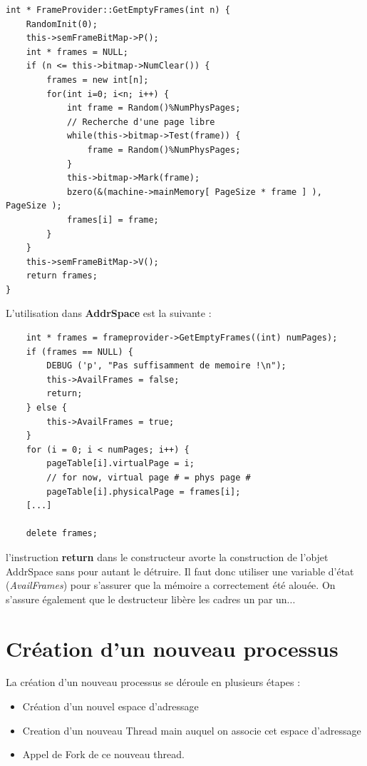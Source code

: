 \documentclass[a4paper,10pt]{article}
\begin{document}
\begin{lstlisting}
int * FrameProvider::GetEmptyFrames(int n) {
    RandomInit(0);
    this->semFrameBitMap->P();
    int * frames = NULL;
    if (n <= this->bitmap->NumClear()) {
        frames = new int[n];
        for(int i=0; i<n; i++) {
            int frame = Random()%NumPhysPages;
            // Recherche d'une page libre
            while(this->bitmap->Test(frame)) {
                frame = Random()%NumPhysPages;
            }
            this->bitmap->Mark(frame);
            bzero(&(machine->mainMemory[ PageSize * frame ] ), PageSize );
            frames[i] = frame;
        }
    }
    this->semFrameBitMap->V();
    return frames;
}
\end{lstlisting}


L'utilisation dans \textbf{AddrSpace} est la suivante :

\begin{lstlisting}
    int * frames = frameprovider->GetEmptyFrames((int) numPages);
    if (frames == NULL) {
        DEBUG ('p', "Pas suffisamment de memoire !\n");
        this->AvailFrames = false;
        return;
    } else {
        this->AvailFrames = true;
    }
    for (i = 0; i < numPages; i++) {
        pageTable[i].virtualPage = i;
        // for now, virtual page # = phys page #
        pageTable[i].physicalPage = frames[i];
    [...]

    delete frames;
\end{lstlisting}

l'instruction \textbf{return} dans le constructeur avorte la construction de
l'objet AddrSpace sans pour autant le détruire. Il faut donc utiliser une
variable d'état (\textit{AvailFrames}) pour s'assurer que la mémoire a
correctement été alouée. On s'assure également que le destructeur libère les
cadres un par un...

\section{Création d'un nouveau processus}

La création d'un nouveau processus se déroule en plusieurs étapes :
\begin{itemize}
\item Création d'un nouvel espace d'adressage
\item Creation d'un nouveau Thread main auquel on associe cet espace d'adressage
\item Appel de Fork de ce nouveau thread.
\end{itemize}
\end{document}
